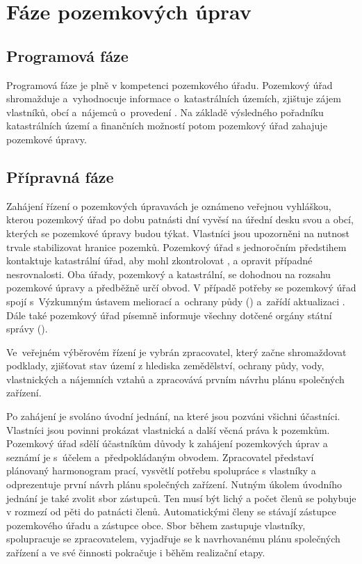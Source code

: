 \section{Fáze pozemkových úprav}
\label{etapy_pu}

\subsection{Programová fáze}
\label{programova_faze}

Programová fáze je plně v kompetenci pozemkového úřadu. Pozemkový úřad shromažduje a~vyhodnocuje informace o~katastrálních územích, zjištuje zájem vlastníků, obcí a~nájemců o~provedení . Na základě výsledného pořadníku katastrálních území a finančních možností potom pozemkový úřad zahajuje pozemkové úpravy.

\subsection{Přípravná fáze}
\label{pripravna_faze}

Zahájení řízení o pozemkových úpravavách je oznámeno veřejnou vyhláškou, kterou pozemkový úřad po dobu patnásti dní vyvěsí na úřední desku svou a obcí, kterých se pozemkové úpravy budou týkat. Vlastníci jsou upozorněni na nutnost trvale stabilizovat hranice pozemků. Pozemkový úřad s jednoročním předstihem kontaktuje katastrální úřad, aby mohl zkontrolovat ,  a opravit případné nesrovnalosti. Oba úřady, pozemkový a katastrální, se dohodnou na rozsahu pozemkové úpravy a předběžně určí obvod. V případě potřeby se pozemkový úřad spojí s~Výzkumným ústavem meliorací a~ochrany půdy () a~zařídí aktualizaci . Dále také pozemkový úřad písemně informuje všechny dotčené orgány státní správy ().

Ve~veřejném výběrovém řízení je vybrán zpracovatel, který začne shromaždovat podklady, zjišťovat stav území z hlediska zemědělství, ochrany půdy, vody, vlastnických a nájemních vztahů a zpracovává prvním návrhu plánu společných zařízení.

Po zahájení  je svoláno úvodní jednání, na které jsou pozváni všichni účastníci. Vlastníci jsou povinni prokázat vlastnická a další věcná práva k pozemkům. Pozemkový úřad sdělí účastníkům důvody k zahájení pozemkových úprav a seznámí je s~účelem a~předpokládaným obvodem. Zpracovatel představí plánovaný harmonogram prací, vysvětlí potřebu spolupráce s vlastníky a odprezentuje první návrh plánu společných zařízení. Nutným úkolem úvodního jednání je také zvolit sbor zástupců. Ten musí být lichý a počet členů se pohybuje v rozmezí od pěti do patnácti členů. Automatickými členy se stávají zástupce pozemkového úřadu a zástupce obce. Sbor během  zastupuje vlastníky, spolupracuje se zpracovatelem, vyjadřuje se k navrhovanému plánu společných zařízení a ve své činnosti pokračuje i běhěm realizační etapy.

